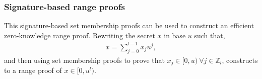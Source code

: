 \subsubsection*{Signature-based range proofs}
This signature-based set membership  proofs can be used to construct an efficient zero-knowledge range proof. Rewriting the secret $x$ in base $u$ such that,
\begin{align*}
    x = \sum_{j=0}^{l-1} x_ju^j,
\end{align*}
and then using set membership proofs to prove that $x_j\in[0,u)\: \forall j\in\mathds{Z}_l$, constructs to a range proof of $x\in[0,u^l)$. %
